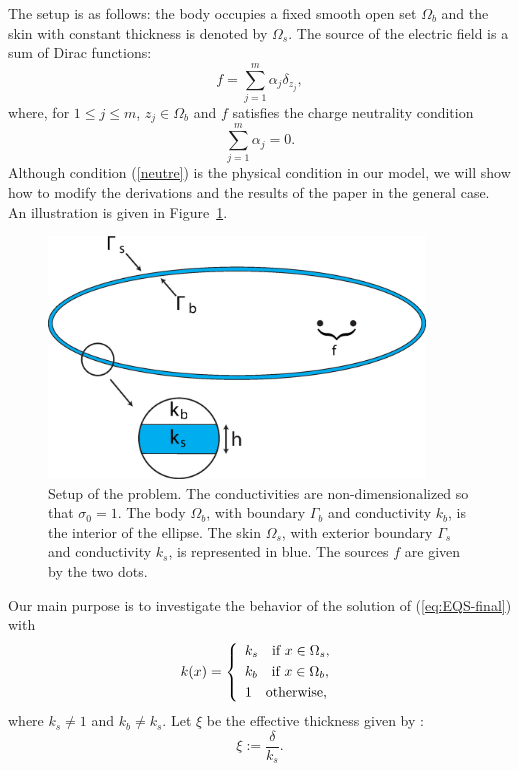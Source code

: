 \documentclass[final]{siamltex}
\newcommand{\ds}{\displaystyle}
\newcommand{\nm}{\noalign{\smallskip}}
\numberwithin{equation}{section}
\numberwithin{figure}{section}
\numberwithin{table}{section}
\begin{document}
The setup is as follows: the body occupies a fixed smooth open set
$\Omega_{b}$ and the skin with constant thickness is denoted by
$\Omega_{s}$.
 The source of the electric field is a sum of Dirac functions:
\begin{equation} \label{sumdirac}
f= \sum_{j=1}^{m}\alpha_{j}\delta_{z_{j}},
\end{equation}
 where, for $1\leq j\leq m$, $z_{j}\in\Omega_{b}$ and $f$ satisfies
 the charge neutrality condition
\begin{equation} \label{neutre}
\ds \sum_{j=1}^m \alpha_{j}=0.
\end{equation}
Although condition (\ref{neutre}) is the physical condition in our
model, we will show how to modify the derivations and the results
of the paper in the general case. An illustration is given in
Figure~\ref{fig:Setup}.
\begin{figure}
\centering\includegraphics[width=10cm]{fish_model.eps}
\caption{Setup of the problem. The conductivities are
non-dimensionalized so that $\sigma_{0}=1$. The body $\Omega_{b}$,
with boundary $\Gamma_b$ and conductivity $k_b$, is the interior
of the ellipse. The skin $\Omega_{s}$, with exterior boundary
$\Gamma_s$ and conductivity $k_s$, is represented in blue. The
sources $f$ are given by the two dots. \label{fig:Setup}}
\end{figure}

Our main purpose is to investigate the behavior of the solution of
(\ref{eq:EQS-final}) with
\begin{equation} \label{defk}
k(x)=\left\{\begin{array}{l} k_s \quad \mbox{if } x \in \Omega_s,\\
\nm k_b \quad \mbox{if } x \in \Omega_b,\\
\nm 1 \quad \mbox{otherwise},
\end{array}
\right.
\end{equation}
where $k_s \neq 1$ and $k_b \neq k_s$. Let $\xi$ be the effective
thickness given by \cite{assad1990hypercube}:
\begin{equation} \label{defxi}
\xi:=\frac{\delta}{k_{s}}.
\end{equation}
\end{document}
